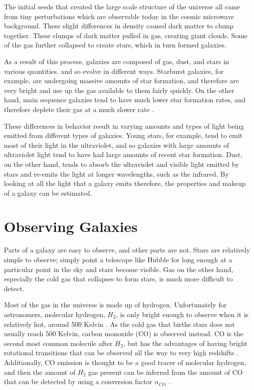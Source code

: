 \documentclass[twoside,single]{lion-msc}
\begin{document}
The initial seeds that created the large scale structure of the universe all came from tiny perturbations which are observable today in the cosmic microwave background. These slight differences in density caused dark matter to clump together. These clumps of dark matter pulled in gas, creating giant clouds. Some of the gas further collapsed to create stars, which in turn formed galaxies.

As a result of this process, galaxies are composed of gas, dust, and stars in various quantities, and so evolve in different ways. Starburst galaxies, for example, are undergoing massive amounts of star formation, and therefore are very bright and use up the gas available to them fairly quickly. On the other hand, main sequence galaxies tend to have much lower star formation rates, and therefore deplete their gas at a much slower rate \cite{scoville2017evolution, silverman2015higher}.

These differences in behavior result in varying amounts and types of light being emitted from different types of galaxies. Young stars, for example, tend to emit most of their light in the ultraviolet, and so galaxies with large amounts of ultraviolet light tend to have had large amounts of recent star formation. Dust, on the other hand, tends to absorb the ultraviolet and visible light emitted by stars and re-emits the light at longer wavelengths, such as the infrared. By looking at all the light that a galaxy emits therefore, the properties and makeup of a galaxy can be estimated.

\section{Observing Galaxies}

Parts of a galaxy are easy to observe, and other parts are not. Stars are relatively simple to observe; simply point a telescope like Hubble for long enough at a particular point in the sky and stars become visible. Gas on the other hand, especially the cold gas that collapses to form stars, is much more difficult to detect. %

Most of the gas in the universe is made up of hydrogen. Unfortunately for astronomers, molecular hydrogen, $H_2$, is only bright enough to observe when it is relatively hot, around 500 Kelvin \cite{decarli2019alma}. As the cold gas that births stars does not usually reach 500 Kelvin, carbon monoxide (CO) is observed instead. CO is the second most common molecule after $H_2$, but has the advantages of having bright rotational transitions that can be observed all the way to very high redshifts \cite{walter2016alma, decarli2019alma}. Additionally, CO emission is thought to be a good tracer of molecular hydrogen, and then the amount of $H_2$ gas present can be inferred from the amount of CO that can be detected by using a conversion factor $\alpha_{CO}$ \cite{decarli2019alma}. 
\end{document}
